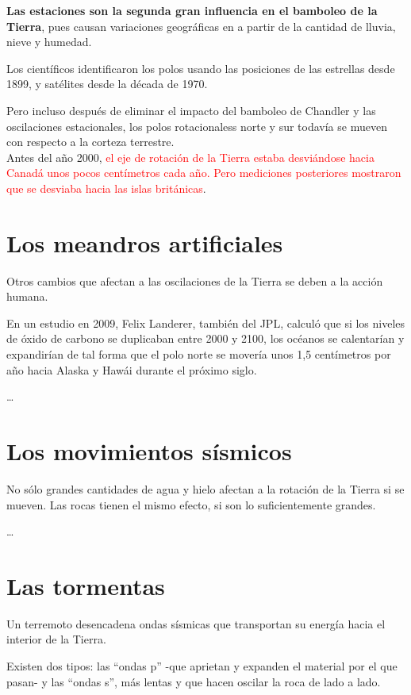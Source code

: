 \documentclass[12pt,a4paper]{article}
\begin{document}
\textbf{Las estaciones son la segunda gran influencia en el bamboleo de la Tierra}, pues causan variaciones geográficas en a partir de la cantidad de lluvia, nieve y humedad.

Los científicos identificaron los polos usando las posiciones de las estrellas desde 1899, y satélites desde la década de 1970.

Pero incluso después de eliminar el impacto del bamboleo de Chandler y las oscilaciones estacionales, los polos rotacionaless norte y sur todavía se mueven con respecto a la corteza terrestre.\\[2mm]

Antes del año 2000, \textcolor{red}{el eje de rotación de la Tierra estaba desviándose hacia Canadá unos pocos centímetros cada año. Pero mediciones posteriores mostraron que se desviaba hacia las islas británicas}.

\section{Los meandros artificiales}

Otros cambios que afectan a las oscilaciones de la Tierra se deben a la acción humana.

En un estudio en 2009, Felix Landerer, también del JPL, calculó que si los niveles de óxido de carbono se duplicaban entre 2000 y 2100, los océanos se calentarían y expandirían de tal forma que el polo norte se movería unos 1,5 centímetros por año hacia Alaska y Hawái durante el próximo siglo.

\ldots

\section{Los movimientos sísmicos}

No sólo grandes cantidades de agua y hielo afectan a la rotación de la Tierra si se mueven. Las rocas tienen el mismo efecto, si son lo suficientemente grandes.

\ldots

\section{Las tormentas}

Un terremoto desencadena ondas sísmicas que transportan su energía hacia el interior de la Tierra.

Existen dos tipos: las ``ondas p'' -que aprietan y expanden el material por el que pasan- y las ``ondas s'', más lentas y que hacen oscilar la roca de lado a lado.
\end{document}
